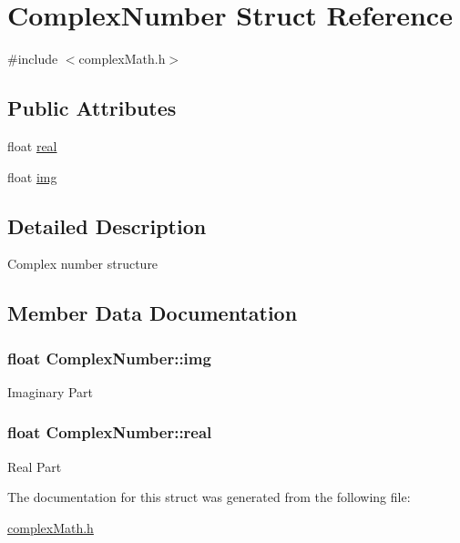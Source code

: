 \hypertarget{structComplexNumber}{}\section{Complex\+Number Struct Reference}
\label{structComplexNumber}


{\ttfamily \#include $<$complex\+Math.\+h$>$}

\subsection*{Public Attributes}
{\bf }\par
\begin{DoxyCompactItemize}
\item 
float \hyperlink{structComplexNumber_a19ded39d7e9f32f1572d13406b5e07ed}{real}
\item 
float \hyperlink{structComplexNumber_aee2a3e161e996b5301691844b1b8f3d2}{img}
\end{DoxyCompactItemize}



\subsection{Detailed Description}
Complex number structure 

\subsection{Member Data Documentation}
\subsubsection[{\texorpdfstring{img}{img}}]{\setlength{\rightskip}{0pt plus 5cm}float Complex\+Number\+::img}\hypertarget{structComplexNumber_aee2a3e161e996b5301691844b1b8f3d2}{}\label{structComplexNumber_aee2a3e161e996b5301691844b1b8f3d2}
Imaginary Part 
\subsubsection[{\texorpdfstring{real}{real}}]{\setlength{\rightskip}{0pt plus 5cm}float Complex\+Number\+::real}\hypertarget{structComplexNumber_a19ded39d7e9f32f1572d13406b5e07ed}{}\label{structComplexNumber_a19ded39d7e9f32f1572d13406b5e07ed}
Real Part 

The documentation for this struct was generated from the following file\+:\begin{DoxyCompactItemize}
\item 
\hyperlink{complexMath_8h}{complex\+Math.\+h}\end{DoxyCompactItemize}
